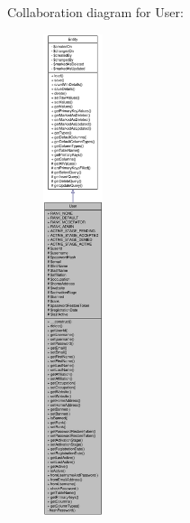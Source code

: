 Collaboration diagram for User:\nopagebreak
\begin{figure}[H]
\begin{center}
\leavevmode
\includegraphics[height=400pt]{classUser__coll__graph}
\end{center}
\end{figure}
